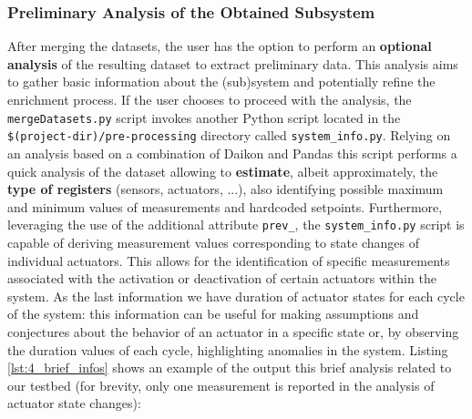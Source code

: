 \vfill

\subsubsection{Preliminary Analysis of the Obtained Subsystem}
\label{subsubsec:4_brief_analysis}

After merging the datasets, the user has the option to perform an \textbf{optional analysis} of the resulting dataset to extract preliminary data. This analysis aims to gather basic information about the (sub)system and potentially refine the enrichment process. If the user chooses to proceed with the analysis, the \texttt{mergeDatasets.py} script invokes another Python script located in the \texttt{\$(project-dir)/pre-processing} directory called \texttt{system\_info.py}.\newline
Relying on an analysis based on a combination of Daikon and Pandas this script performs a quick analysis of the dataset allowing to \textbf{estimate}, albeit approximately, the \textbf{type of registers} (sensors, actuators, ...), also identifying possible maximum and minimum values of measurements and hardcoded setpoints. Furthermore, leveraging the use of the additional attribute \texttt{prev\_}, the \texttt{system\_info.py} script is capable of deriving measurement values corresponding to state changes of individual actuators. This allows for the identification of specific measurements associated with the activation or deactivation of certain actuators within the system.\newline
As the last information we have duration of actuator states for each cycle of the system: this information can be useful for making assumptions and conjectures about the behavior of an actuator in a specific state or, by observing the duration values of each cycle, highlighting anomalies in the system. \newline \newline
Listing \ref{lst:4_brief_infos} shows an example of the output this brief analysis related to our testbed (for brevity, only one measurement is reported in the analysis of actuator state changes):

